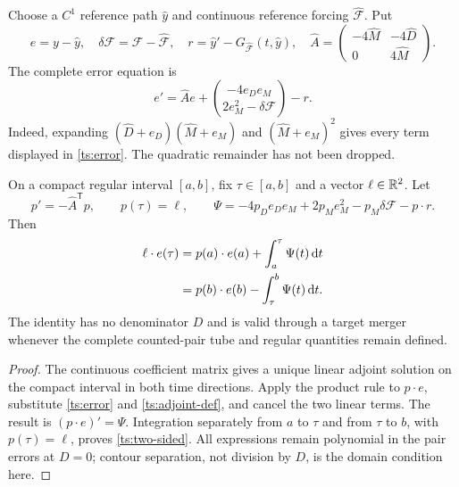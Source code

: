Choose a $C^1$ reference path $\widehat y$ and continuous reference
forcing $\widehat{\mathcal F}$. Put
\begin{equation}
 e=y-\widehat y,\quad
 \delta\mathcal F=\mathcal F-\widehat{\mathcal F},\quad
 r=\widehat y'-G_{\widehat{\mathcal F}}(t,\widehat y),\quad
 \widehat A=
 \begin{pmatrix}-4\widehat M&-4\widehat D\\0&4\widehat M\end{pmatrix}.
 \label{ts:reference}
\end{equation}
The complete error equation is
\begin{equation}
 e'=\widehat A e+
       \binom{-4e_De_M}{2e_M^2-\delta\mathcal F}-r.
 \label{ts:error}
\end{equation}
Indeed, expanding $(\widehat D+e_D)(\widehat M+e_M)$ and
$(\widehat M+e_M)^2$ gives every term displayed in
\eqref{ts:error}. The quadratic remainder has not been dropped.

\begin{proposition}\label{ts:adjoint}
On a compact regular interval $[a,b]$, fix $\tau\in[a,b]$ and a vector
$\ell\in\mathbb R^2$. Let
\begin{equation}
 p'=-\widehat A^{\mathsf T}p,\qquad p(\tau)=\ell,
 \qquad
 \Psi=-4p_De_De_M+2p_Me_M^2-p_M\delta\mathcal F-p\cdot r.
 \label{ts:adjoint-def}
\end{equation}
Then
\begin{align}
 \ell\cdot e(\tau)
 &=p(a)\cdot e(a)+\int_a^\tau\Psi(t)\,\mathrm d t\notag\\
 &=p(b)\cdot e(b)-\int_\tau^b\Psi(t)\,\mathrm d t.
 \label{ts:two-sided}
\end{align}
The identity has no denominator $D$ and is valid through a target merger
whenever the complete counted-pair tube and regular quantities remain
defined.
\end{proposition}

\begin{proof}
The continuous coefficient matrix gives a unique linear adjoint solution
on the compact interval in both time directions. Apply the product rule
to $p\cdot e$, substitute \eqref{ts:error} and
\eqref{ts:adjoint-def}, and cancel the two linear terms. The result is
$(p\cdot e)'=\Psi$. Integration separately from $a$ to $\tau$ and from
$\tau$ to $b$, with $p(\tau)=\ell$, proves
\eqref{ts:two-sided}. All expressions remain polynomial in the pair
errors at $D=0$; contour separation, not division by $D$, is the domain
condition here.
\end{proof}

